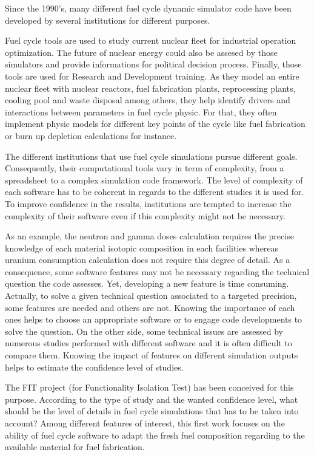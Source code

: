 Since the 1990's, many different fuel cycle dynamic simulator code have been developed by several institutions for different purposes.

Fuel cycle tools are used to study current nuclear fleet for industrial operation optimization. The future of nuclear energy could also be assesed by those simulators and provide informations for political decision process. Finally, those tools are used for Research and Development training. As they model an entire nuclear fleet with nuclear reactors, fuel fabrication plants, reprocessing plants, cooling pool and waste disposal among others, they help identify drivers and interactions between parameters in fuel cycle physic. For that, they often implement physic models for different key points of the cycle like fuel fabrication or burn up depletion calculations for instance.

The different institutions that use fuel cycle simulations pursue different goals. Consequently, their computational tools vary in term of complexity, from a spreadsheet to a complex simulation code framework. The level of complexity of each software has to be coherent in regards to the different studies it is used for. To improve confidence in the results, institutions are tempted to increase the complexity of their software even if this complexity might not be necessary.

As an example, the neutron and gamma doses calculation requires the precise knowledge of each material isotopic composition in each facilities whereas uranium consumption calculation does not require this degree of detail. As a consequence, some software features may not be necessary regarding the technical question the code assesses. Yet, developing a new feature is time consuming. Actually, to solve a given technical question associated to a targeted precision, some features are needed and others are not. Knowing the importance of each ones helps to choose an appropriate software or to engage code developments to solve the question. On the other side, some technical issues are assessed by numerous studies performed with different software and it is often difficult to compare them. Knowing the impact of features on different simulation outputs helps to estimate the confidence level of studies.

The FIT project (for Functionality Isolation Test) has been conceived for this purpose. According to the type of study and the wanted confidence level, what should be the level of details in fuel cycle simulations that has to be taken into account? Among different features of interest, this first work focuses on the ability of fuel cycle software to adapt the fresh fuel composition regarding to the available material for fuel fabrication.

